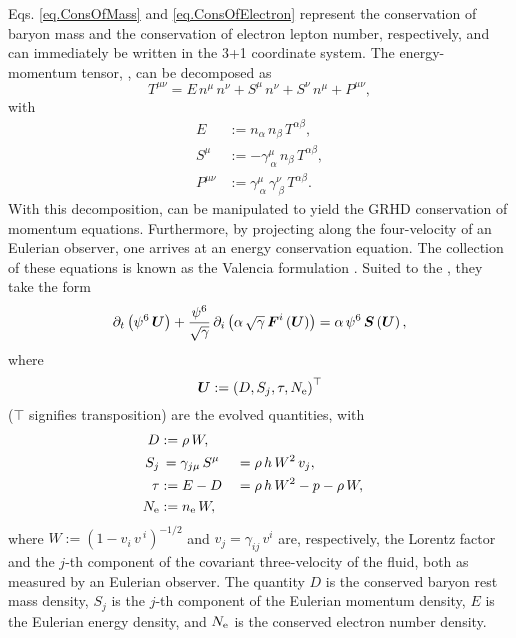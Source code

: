 Eqs. \eqref{eq.ConsOfMass} and \eqref{eq.ConsOfElectron}
represent the conservation of baryon mass
and the conservation of electron lepton number, respectively,
and can immediately be written in the 3+1 coordinate system.
The energy-momentum tensor, , can be decomposed as
\begin{equation}
  T^{\mu\nu}=E\,n^{\mu}\,n^{\nu}+S^{\mu}\,n^{\nu}+S^{\nu}\,n^{\mu}+P^{\mu\nu},
\end{equation}
with
\begin{align}
  E&:=n_{\alpha}\,n_{\beta}\,T^{\alpha\beta},\\
  S^{\mu}&:=-\gamma^{\mu}_{~\alpha}\,n_{\beta}\,T^{\alpha\beta},\\
  P^{\mu\nu}&:=\gamma^{\mu}_{~\alpha}\,\gamma^{\nu}_{~\beta}\,T^{\alpha\beta}.
\end{align}
With this decomposition,  can be manipulated to
yield the GRHD conservation of momentum equations.
Furthermore, by projecting  along the four-velocity
of an Eulerian observer, one arrives at an energy conservation equation.
The collection of these equations is known as the Valencia formulation
\citep{bfi1997,rz2013}.
Suited to the \xcfc, they take the form
\begin{equation}
  \partial_{t}\left(\psi^{6}\,\boldsymbol{U}\right)
  +\frac{\psi^{6}}{\sqrt{\gamma}}\,
  \partial_{i}\left(\alpha\,\sqrt{\gamma}\,\boldsymbol{F}^{i}\left(\boldsymbol{U}\right)\right)
  =\alpha\,\psi^{6}\,\boldsymbol{S}\left(\boldsymbol{U}\right),
  \label{eq.consLaws}
\end{equation}
where
\begin{equation}
  \boldsymbol{U}:=\left(D,S_{j},\tau,N_{\mathrm{e}}\right)^{\top}
\end{equation}
($\top$ signifies transposition)
are the evolved quantities, with
\begin{alignat}{2}
  D&:=\rho\,W,\\
  S_{j}&\,=\gamma_{j\mu}\,S^{\mu}&&=\rho\,h\,W^{2}\,v_{j},\\
  \tau&:=E-D&&=\rho\,h\,W^{2}-p-\rho\,W,\\
  N_{\mathrm{e}}&:=n_{\mathrm{e}}\,W,
\end{alignat}
where $W:=\left(1-v_{i}\,v\,^{i}\right)^{-1/2}$ and $v_{j}=\gamma_{ij}\,v^{i}$
are, respectively, the Lorentz factor and the $j$-th component of the covariant
three-velocity of the fluid, both as measured by an Eulerian observer.
The quantity $D$ is the conserved baryon rest mass density,
$S_{j}$ is the $j$-th component of the Eulerian momentum density,
$E$ is the Eulerian energy density,
and $N_{\mathrm{e}}$ is the conserved electron number density.
